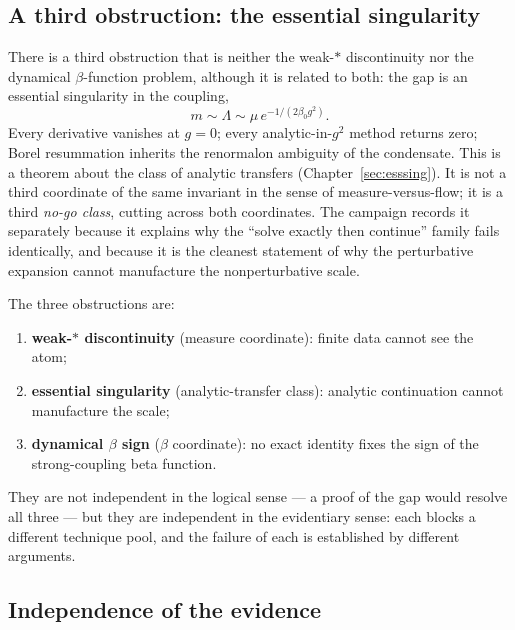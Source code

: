 \subsection{A third obstruction: the essential singularity}

There is a third obstruction that is neither the weak-$*$ discontinuity nor the dynamical
$\beta$-function problem, although it is related to both: the gap is an essential singularity in
the coupling,
\begin{equation}
m\sim\Lambda\sim\mu\,e^{-1/(2\beta_0g^2)} .
\label{eq:ess3}
\end{equation}
Every derivative vanishes at $g=0$; every analytic-in-$g^2$ method returns zero; Borel
resummation inherits the renormalon ambiguity of the condensate. This is a theorem about the
class of analytic transfers (Chapter~\ref{sec:esssing}). It is not a third coordinate of the same
invariant in the sense of measure-versus-flow; it is a third \emph{no-go class}, cutting across
both coordinates. The campaign records it separately because it explains why the ``solve exactly
then continue'' family fails identically, and because it is the cleanest statement of why the
perturbative expansion cannot manufacture the nonperturbative scale.

The three obstructions are:
\begin{enumerate}
\item \textbf{weak-$*$ discontinuity} (measure coordinate): finite data cannot see the atom;
\item \textbf{essential singularity} (analytic-transfer class): analytic continuation cannot
  manufacture the scale;
\item \textbf{dynamical $\beta$ sign} ($\beta$ coordinate): no exact identity fixes the sign of
  the strong-coupling beta function.
\end{enumerate}
They are not independent in the logical sense --- a proof of the gap would resolve all three ---
but they are independent in the evidentiary sense: each blocks a different technique pool, and
the failure of each is established by different arguments.

\subsection{Independence of the evidence}

